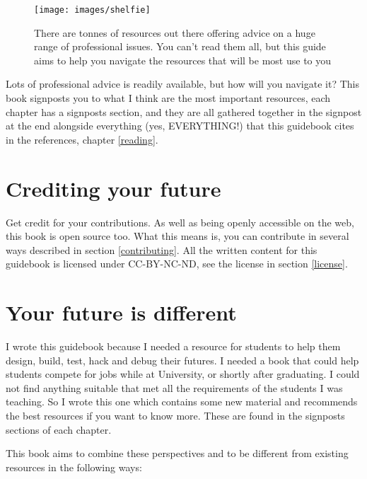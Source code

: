 \documentclass[
]{book}
\begin{document}
\begin{figure}

{\centering \texttt{[image: images/shelfie]} 

}

\caption{There are tonnes of resources out there offering advice on a huge range of professional issues. You can't read them all, but this guide aims to help you navigate the resources that will be most use to you}\label{fig:shelfie-fig}
\end{figure}



Lots of professional advice is readily available, but how will you navigate it? This book signposts you to what I think are the most important resources, each chapter has a signposts section, and they are all gathered together in the signpost at the end alongside everything (yes, EVERYTHING!) that this guidebook cites in the references, chapter \ref{reading}.

\hypertarget{crediting}{%
\section{Crediting your future}\label{crediting}}

Get credit for your contributions. As well as being openly accessible on the web, this book is open source too. What this means is, you can contribute in several ways described in section \ref{contributing}. All the written content for this guidebook is licensed under CC-BY-NC-ND, see the license in section \ref{license}.

\hypertarget{thinkdifferent}{%
\section{Your future is different}\label{thinkdifferent}}

I wrote this guidebook because I needed a resource for students to help them design, build, test, hack and debug their futures. I needed a book that could help students compete for jobs while at University, or shortly after graduating. I could not find anything suitable that met all the requirements of the students I was teaching. So I wrote this one which contains some new material and recommends the best resources if you want to know more. These are found in the signposts sections of each chapter.

This book aims to combine these perspectives and to be different from existing resources in the following ways:
\end{document}
